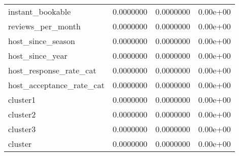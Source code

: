 \begin{tabular}[t]{lrrr}
\addlinespace
instant\_bookable & 0.0000000 & 0.0000000 & 0.00e+00\\
reviews\_per\_month & 0.0000000 & 0.0000000 & 0.00e+00\\
host\_since\_season & 0.0000000 & 0.0000000 & 0.00e+00\\
host\_since\_year & 0.0000000 & 0.0000000 & 0.00e+00\\
host\_response\_rate\_cat & 0.0000000 & 0.0000000 & 0.00e+00\\
\addlinespace
host\_acceptance\_rate\_cat & 0.0000000 & 0.0000000 & 0.00e+00\\
cluster1 & 0.0000000 & 0.0000000 & 0.00e+00\\
cluster2 & 0.0000000 & 0.0000000 & 0.00e+00\\
cluster3 & 0.0000000 & 0.0000000 & 0.00e+00\\
cluster & 0.0000000 & 0.0000000 & 0.00e+00\\
\bottomrule
\end{tabular}